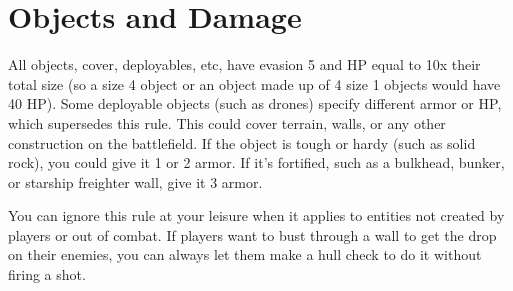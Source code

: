 \section{Objects and Damage}

All objects, cover, deployables, etc, have evasion 5 and HP equal to 10x their total size (so a size
4 object or an object made up of 4 size 1 objects would have 40 HP). Some deployable objects
(such as drones) specify different armor or HP, which supersedes this rule. This could cover
terrain, walls, or any other construction on the battlefield. If the object is tough or hardy (such as
solid rock), you could give it 1 or 2 armor. If it’s fortified, such as a bulkhead, bunker, or starship
freighter wall, give it 3 armor.

You can ignore this rule at your leisure when it applies to entities not created by players or out of
combat. If players want to bust through a wall to get the drop on their enemies, you can always let
them make a hull check to do it without firing a shot.